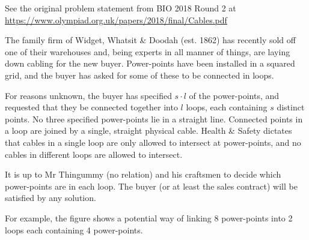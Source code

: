 \begin{center}\small{
    See the original problem statement from BIO 2018 Round 2 at
    \url{https://www.olympiad.org.uk/papers/2018/final/Cables.pdf}
}\end{center}

The family firm of Widget, Whatsit & Doodah (est. 1862) has recently sold off
one of their warehouses and, being experts in all manner of things, are laying
down cabling for the new buyer. Power-points have been installed in a squared
grid, and the buyer has asked for some of these to be connected in loops.

For reasons unknown, the buyer has specified $s \cdot l$ of the power-points, and
requested that they be connected together into $l$ loops, each containing $s$ distinct
points. No three specified power-points lie in a straight line. Connected points in
a loop are joined by a single, straight physical cable. Health & Safety dictates that
cables in a single loop are only allowed to intersect at power-points, and no
cables in different loops are allowed to intersect.

It is up to Mr Thingummy (no relation) and his craftsmen to decide which
power-points are in each loop. The buyer (or at least the sales contract) will be
satisfied by any solution.

For example, the figure shows a potential way of linking 8 power-points into 2
loops each containing 4 power-points.
